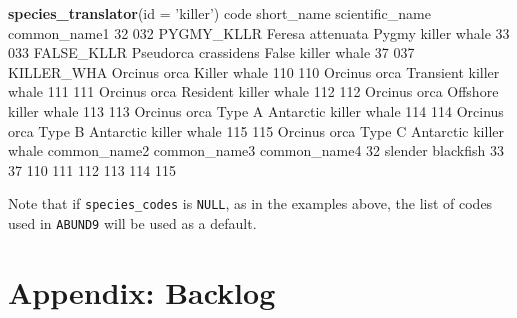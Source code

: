 \documentclass[
]{book}
\newenvironment{Shaded}{\begin{snugshade}}{\end{snugshade}}
\newcommand{\DataTypeTok}[1]{\textcolor[rgb]{0.13,0.29,0.53}{#1}}
\newcommand{\DecValTok}[1]{\textcolor[rgb]{0.00,0.00,0.81}{#1}}
\newcommand{\KeywordTok}[1]{\textcolor[rgb]{0.13,0.29,0.53}{\textbf{#1}}}
\newcommand{\NormalTok}[1]{#1}
\newcommand{\StringTok}[1]{\textcolor[rgb]{0.31,0.60,0.02}{#1}}
\begin{document}
\begin{Shaded}
\begin{Highlighting}[]
\KeywordTok{species_translator}\NormalTok{(}\DataTypeTok{id =} \StringTok{'killer'}\NormalTok{)}
\NormalTok{    code short_name      scientific_name                  common_name1}
\DecValTok{32}   \DecValTok{032}\NormalTok{ PYGMY_KLLR     Feresa attenuata            Pygmy killer whale}
\DecValTok{33}   \DecValTok{033}\NormalTok{ FALSE_KLLR Pseudorca crassidens            False killer whale}
\DecValTok{37}   \DecValTok{037}\NormalTok{ KILLER_WHA         Orcinus orca                  Killer whale}
\DecValTok{110}  \DecValTok{110}\NormalTok{                    Orcinus orca        Transient killer whale}
\DecValTok{111}  \DecValTok{111}\NormalTok{                    Orcinus orca         Resident killer whale}
\DecValTok{112}  \DecValTok{112}\NormalTok{                    Orcinus orca         Offshore killer whale}
\DecValTok{113}  \DecValTok{113}\NormalTok{                    Orcinus orca Type A Antarctic killer whale}
\DecValTok{114}  \DecValTok{114}\NormalTok{                    Orcinus orca Type B Antarctic killer whale}
\DecValTok{115}  \DecValTok{115}\NormalTok{                    Orcinus orca Type C Antarctic killer whale}
\NormalTok{         common_name2 common_name3 common_name4}
\DecValTok{32}\NormalTok{  slender blackfish                          }
\DecValTok{33}                                             
\DecValTok{37}                                             
\DecValTok{110}                                            
\DecValTok{111}                                            
\DecValTok{112}                                            
\DecValTok{113}                                            
\DecValTok{114}                                            
\DecValTok{115}                                            
\end{Highlighting}
\end{Shaded}

Note that if \texttt{species\_codes} is \texttt{NULL}, as in the examples above, the list of codes used in \texttt{ABUND9} will be used as a default.

\hypertarget{backlog}{%
\chapter{Appendix: Backlog}\label{backlog}}
\end{document}
